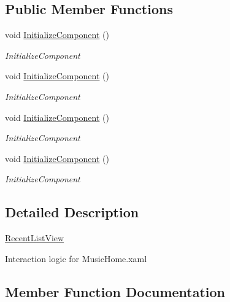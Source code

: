 \subsection*{Public Member Functions}
\begin{DoxyCompactItemize}
\item 
void \hyperlink{class_presentation_1_1_view_1_1_list_1_1_recent_list_view_a9b8ba95e34c16c869bd75522ceacb7dc}{Initialize\+Component} ()
\begin{DoxyCompactList}\small\item\em Initialize\+Component \end{DoxyCompactList}\item 
void \hyperlink{class_presentation_1_1_view_1_1_list_1_1_recent_list_view_a9b8ba95e34c16c869bd75522ceacb7dc}{Initialize\+Component} ()
\begin{DoxyCompactList}\small\item\em Initialize\+Component \end{DoxyCompactList}\item 
void \hyperlink{class_presentation_1_1_view_1_1_list_1_1_recent_list_view_a9b8ba95e34c16c869bd75522ceacb7dc}{Initialize\+Component} ()
\begin{DoxyCompactList}\small\item\em Initialize\+Component \end{DoxyCompactList}\item 
void \hyperlink{class_presentation_1_1_view_1_1_list_1_1_recent_list_view_a9b8ba95e34c16c869bd75522ceacb7dc}{Initialize\+Component} ()
\begin{DoxyCompactList}\small\item\em Initialize\+Component \end{DoxyCompactList}\end{DoxyCompactItemize}


\subsection{Detailed Description}
\hyperlink{class_presentation_1_1_view_1_1_list_1_1_recent_list_view}{Recent\+List\+View} 

Interaction logic for Music\+Home.\+xaml 

\subsection{Member Function Documentation}
\mbox{\label{class_presentation_1_1_view_1_1_list_1_1_recent_list_view_a9b8ba95e34c16c869bd75522ceacb7dc}} 
